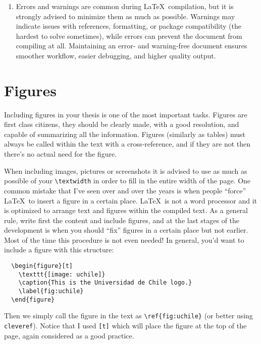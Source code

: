 \begin{enumerate}
  \item Errors and warnings are common during \LaTeX\ compilation, but it is strongly advised to minimize them as much as possible. Warnings may indicate issues with references, formatting, or package compatibility (the hardest to solve sometimes), while errors can prevent the document from compiling at all. Maintaining an error- and warning-free document ensures smoother workflow, easier debugging, and higher quality output.
  
  
\end{enumerate}


\section{Figures}
\label{sec:figures}

Including figures in your thesis is one of the most important tasks. Figures are first class citizens, they should be clearly made, with a good resolution, and capable of summarizing all the information. Figures (similarly as tables) must always be called within the text with a cross-reference, and if they are not then there's no actual need for the figure.

When including images, pictures or screenshots it is advised to use as much as possible of your \verb|\textwidth| in order to fill in the entire width of the page. One common mistake that I've seen over and over the years is when people ``force'' \LaTeX\ to insert a figure in a certain place. \LaTeX\ is not a word processor and it is optimized to arrange text and figures within the compiled text. As a general rule, write first the content and include figures, and at the last stages of the development is when you should ``fix'' figures in a certain place but not earlier. Most of the time this procedure is not even needed!
In general, you'd want to include a figure with this structure:
\begin{verbatim}
  \begin{figure}[t]
    \texttt{[image: uchile]}
    \caption{This is the Universidad de Chile logo.}
    \label{fig:uchile}
  \end{figure}
\end{verbatim}
Then we simply call the figure in the text as \verb|\ref{fig:uchile}| (or better using \texttt{cleveref}). Notice that I used \texttt{[t]} which will place the figure at the top of the page, again considered as a good practice.

